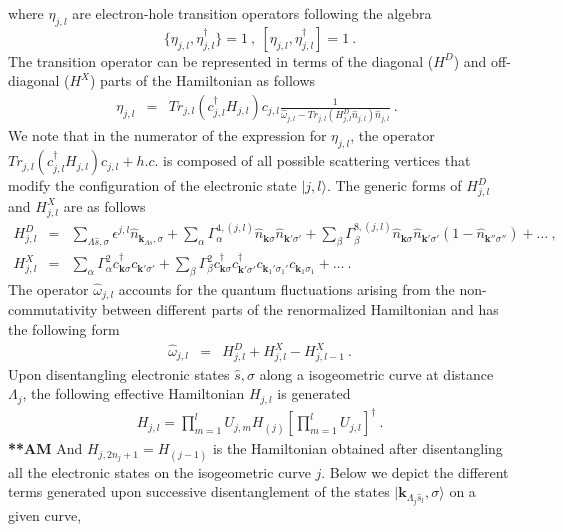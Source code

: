 \documentclass[aps,prl,preprint,groupedaddress]{revtex4-2}
\begin{document}
where $\eta_{j,l}$ are electron-hole transition operators following the algebra
\begin{equation}
\lbrace\eta_{j,l},\eta_{j,l}^{\dagger}\rbrace=1~,~\left[\eta_{j,l},\eta_{j,l}^{\dagger}\right]=1~.
\end{equation}
The transition operator can be represented in terms of the diagonal ($H^{D}$) and off-diagonal ($H^{X}$) parts of the Hamiltonian as follows 
\begin{eqnarray}
\eta_{j,l}&=&Tr_{j,l}(c^{\dagger}_{j,l}H_{j,l})c_{j,l}\frac{1}{\hat{\omega}_{j,l}-Tr_{j,l}(H_{j,l}^{D}\hat{n}_{j,l})\hat{n}_{j,l}}~.~~\label{e-TransOp}
\end{eqnarray}
We note that in the numerator of the expression for $\eta_{j,l}$, the operator $Tr_{j,l}(c^{\dagger}_{j,l}H_{j,l})c_{j,l}+h.c.$ is composed of all possible scattering vertices that modify the configuration of the electronic state $|j,l\rangle$. The generic forms of $H^{D}_{j,l}$ and $H^{X}_{j,l}$ are as follows
\begin{eqnarray}
H^{D}_{j,l}&=&\sum_{\Lambda\hat{s},\sigma}\epsilon^{j,l}\hat{n}_{\mathbf{k}_{\Lambda\hat{s}},\sigma}+\sum_{\alpha}\Gamma_{\alpha}^{4,(j,l)}\hat{n}_{\mathbf{k}\sigma}\hat{n}_{\mathbf{k}'\sigma'}+\sum_{\beta}\Gamma_{\beta}^{8,(j,l)}\hat{n}_{\mathbf{k}\sigma}\hat{n}_{\mathbf{k}'\sigma'}(1-\hat{n}_{\mathbf{k}''\sigma''})+\ldots~,\nonumber\\
H^{X}_{j,l}&=&\sum_{\alpha}\Gamma_{\alpha}^{2}c^{\dagger}_{\mathbf{k}\sigma}c_{\mathbf{k}'\sigma'}+\sum_{\beta}\Gamma_{\beta}^{2}c^{\dagger}_{\mathbf{k}\sigma}c^{\dagger}_{\mathbf{k}'\sigma'}c_{\mathbf{k}_{1}'\sigma_{1}'}c_{\mathbf{k}_{1}\sigma_{1}}+\ldots~.
\end{eqnarray}
The operator $\hat{\omega}_{j,l}$ accounts for the quantum fluctuations arising from the non-commutativity between different parts of the renormalized Hamiltonian and has the following form~\cite{anirbanurg1}
\begin{eqnarray}
\hat{\omega}_{j,l}&=&H^{D}_{j,l}+H^{X}_{j,l}-H^{X}_{j,l-1}~.\label{qfOp}
\end{eqnarray}
Upon disentangling electronic states $\hat{s},\sigma$ along a isogeometric curve at distance $\Lambda_{j}$, the following effective Hamiltonian $H_{j,l}$ is generated 
\begin{eqnarray}
H_{j,l}=\prod_{m=1}^{l}U_{j,m}H_{(j)}[\prod_{m=1}^{l}U_{j,l}]^{\dagger}~.
\end{eqnarray}
\textbf{**AM}
And $H_{j,2n_{j}+1}=H_{(j-1)}$ is the Hamiltonian obtained after disentangling all the electronic states on the isogeometric curve $j$. Below we depict the different terms generated upon successive disentanglement of the states $|\mathbf{k}_{\Lambda_{j}\hat{s}_{l}},\sigma\rangle$ on a given curve,
\end{document}
